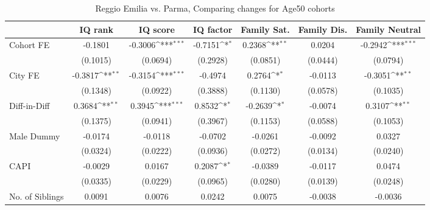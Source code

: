 \begin{table}[htbp]\centering
\def\sym#1{\ifmmode^{#1}\else\(^{#1}\)\fi}
\caption{Reggio Emilia vs. Parma, Comparing changes for Age50 cohorts}
\begin{tabular}{l*{6}{c}}
\toprule
            &\multicolumn{1}{c}{IQ rank}&\multicolumn{1}{c}{IQ score}&\multicolumn{1}{c}{IQ factor}&\multicolumn{1}{c}{Family Sat.}&\multicolumn{1}{c}{Family Dis.}&\multicolumn{1}{c}{Family Neutral}\\
\midrule
Cohort FE   &     -0.1801         &     -0.3006\sym{***}&     -0.7151\sym{*}  &      0.2368\sym{**} &      0.0204         &     -0.2942\sym{***}\\
            &    (0.1015)         &    (0.0694)         &    (0.2928)         &    (0.0851)         &    (0.0444)         &    (0.0794)         \\
\addlinespace
City FE     &     -0.3817\sym{**} &     -0.3154\sym{***}&     -0.4974         &      0.2764\sym{*}  &     -0.0113         &     -0.3051\sym{**} \\
            &    (0.1348)         &    (0.0922)         &    (0.3888)         &    (0.1130)         &    (0.0578)         &    (0.1035)         \\
\addlinespace
Diff-in-Diff&      0.3684\sym{**} &      0.3945\sym{***}&      0.8532\sym{*}  &     -0.2639\sym{*}  &     -0.0074         &      0.3107\sym{**} \\
            &    (0.1375)         &    (0.0941)         &    (0.3967)         &    (0.1153)         &    (0.0588)         &    (0.1053)         \\
\addlinespace
Male Dummy  &     -0.0174         &     -0.0118         &     -0.0702         &     -0.0261         &     -0.0092         &      0.0327         \\
            &    (0.0324)         &    (0.0222)         &    (0.0936)         &    (0.0272)         &    (0.0134)         &    (0.0240)         \\
\addlinespace
CAPI        &     -0.0029         &      0.0167         &      0.2087\sym{*}  &     -0.0389         &     -0.0117         &      0.0474         \\
            &    (0.0335)         &    (0.0229)         &    (0.0965)         &    (0.0280)         &    (0.0139)         &    (0.0248)         \\
\addlinespace
No. of Siblings&      0.0091         &      0.0076         &      0.0242         &      0.0075         &     -0.0038         &     -0.0036         \\

\end{tabular}
\end{table}
